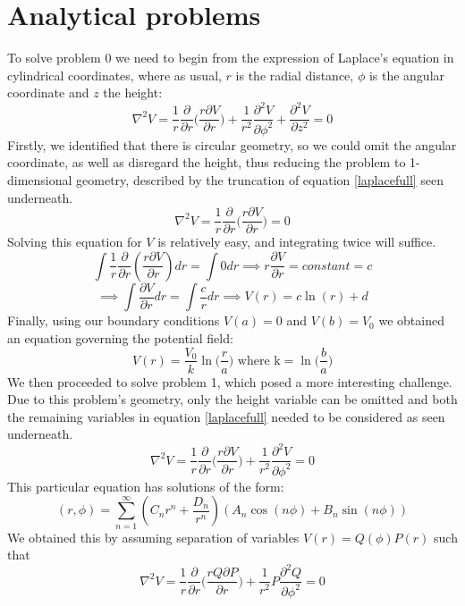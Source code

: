 \documentclass[a4paper]{article}
\begin{document}
\section{Analytical problems}
To solve problem 0 we need to begin from the expression of Laplace's equation 
in cylindrical coordinates, where as usual, $r$ is the radial distance, $\phi$
is the angular coordinate and $z$ the height:
\begin{equation} \label{laplacefull}
\nabla^2V=\frac{1}{r}\frac{\partial}{\partial r}\Big( \frac{r\partial 
V}{\partial r} \Big) + \frac{1}{r^2}\frac{\partial^2V}{\partial\phi^2} + 
\frac{\partial^2V}{\partial z^2} = 0 
\end{equation} 
Firstly, we identified that there is circular geometry, so we could omit the 
angular coordinate, as well as disregard the height, thus reducing the problem 
to 1-dimensional geometry, described by the truncation of equation 
\ref{laplacefull} seen underneath.
\begin{equation}\nabla^2V=\frac{1}{r}\frac{\partial}{\partial r}\Big( 
\frac{r\partial V}{\partial r} \Big) = 0
\end{equation}
Solving this equation for $V$ is relatively easy, and integrating twice will 
suffice.
\begin{equation}\int\frac{1}{r}\frac{\partial}{\partial r}( \frac{r\partial 
V}{\partial r} )dr = \int0dr \implies r\frac{\partial V}{\partial r} = constant 
= c
\end{equation}
\begin{equation}\implies \int\frac{\partial V}{\partial r}dr = \int \frac{c}{r} 
dr \implies V(r) = c\ln(r) + d
\end{equation}
Finally, using our boundary conditions $ V(a) = 0$ and $V(b) = V_0$ we obtained 
an equation governing the potential field:
\begin{equation}\boxed{V(r) = \frac{V_0}{k}\ln\Big(\frac{r}{a}\Big) \textrm{ 
where k} = \ln\Big(\frac{b}{a}\Big) }\end{equation}
We then proceeded to solve problem 1, which posed a more interesting challenge. 
Due to this problem's geometry, only the height variable can be omitted and 
both the remaining variables in equation \ref{laplacefull} needed to be 
considered as seen underneath. 
\begin{equation}\nabla^2V=\frac{1}{r}\frac{\partial}{\partial r}\Big( 
\frac{r\partial V}{\partial r} \Big) + 
\frac{1}{r^2}\frac{\partial^2V}{\partial\phi^2} = 0\end{equation}
This particular equation has solutions of the form:
\begin{equation} \label{gensol}
(r,\phi)=\sum_{n=1}^{\infty} (C_nr^n+\frac{D_n}{r^n})(A_n 
\cos(n\phi)+B_n\sin(n\phi)) 
\end{equation}
We obtained this by assuming separation of variables $V(r) = Q(\phi)P(r)$ such 
that
\begin{equation}\nabla^2V=\frac{1}{r}\frac{\partial}{\partial r}\Big( \frac{rQ 
\partial P}{\partial r} \Big) + 
\frac{1}{r^2}P\frac{\partial^2Q}{\partial\phi^2} = 0
\end{equation}
\end{document}
